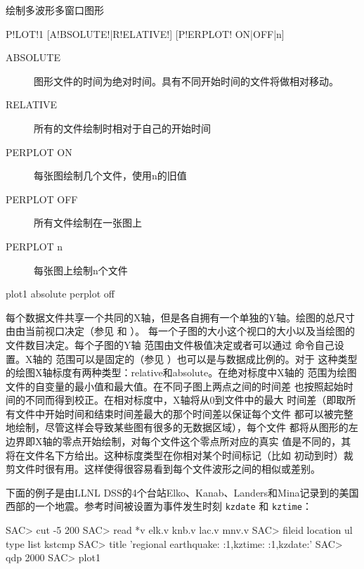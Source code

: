 \label{cmd:plot1}

绘制多波形多窗口图形

\begin{SACSTX}
P!LOT!1 [A!BSOLUTE!|R!ELATIVE!] [P!ERPLOT! ON|OFF|n]
\end{SACSTX}

\begin{description}
\item [ABSOLUTE] 图形文件的时间为绝对时间。具有不同开始时间的文件将做相对移动。
\item [RELATIVE] 所有的文件绘制时相对于自己的开始时间
\item [PERPLOT ON] 每张图绘制几个文件，使用n的旧值
\item [PERPLOT OFF] 所有文件绘制在一张图上
\item [PERPLOT n] 每张图上绘制n个文件
\end{description}

\begin{SACDFT}
plot1 absolute perplot off
\end{SACDFT}

每个数据文件共享一个共同的X轴，但是各自拥有一个单独的Y轴。绘图的总尺寸
由由当前视口决定（参见  和 ）。
每一个子图的大小这个视口的大小以及当绘图的文件数目决定。每个子图的Y轴
范围由文件极值决定或者可以通过  命令自己设置。X轴的
范围可以是固定的（参见 ）也可以是与数据成比例的。对于
这种类型的绘图X轴标度有两种类型：relative和absolute。在绝对标度中X轴的
范围为绘图文件的自变量的最小值和最大值。在不同子图上两点之间的时间差
也按照起始时间的不同而得到校正。在相对标度中，X轴将从0到文件中的最大
时间差（即取所有文件中开始时间和结束时间差最大的那个时间差以保证每个文件
都可以被完整地绘制，尽管这样会导致某些图有很多的无数据区域），每个文件
都将从图形的左边界即X轴的零点开始绘制，对每个文件这个零点所对应的真实
值是不同的，其将在文件名下方给出。这种标度类型在你相对某个时间标记（比如
初动到时）裁剪文件时很有用。这样使得很容易看到每个文件波形之间的相似或差别。

下面的例子是由LLNL DSS的4个台站Elko、Kanab、Landers和Mina记录到的美国
西部的一个地震。参考时间被设置为事件发生时刻 \texttt{kzdate} 和
\texttt{kztime}：
\begin{SACCode}
SAC> cut -5 200
SAC> read *v
 elk.v knb.v lac.v mnv.v
SAC> fileid location ul type list kstcmp
SAC> title 'regional earthquake:  :1,kztime:  :1,kzdate:'
SAC> qdp 2000
SAC> plot1
\end{SACCode}
